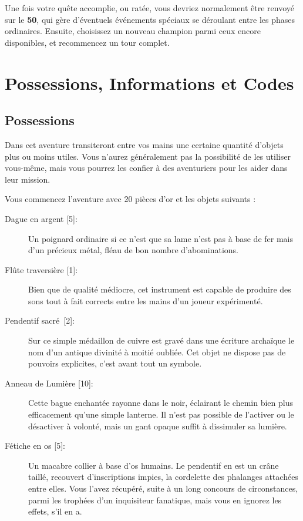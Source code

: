 \documentclass{report}
\begin{document}
Une fois votre quête accomplie, ou ratée, vous devriez normalement être renvoyé sur le \textbf{50}, qui gère d'éventuels événements spéciaux se déroulant entre les phases ordinaires. Ensuite, choisissez un nouveau champion parmi ceux encore disponibles, et recommencez un tour complet.

\section{Possessions, Informations et Codes}

\subsection{Possessions}

Dans cet aventure transiteront entre vos mains une certaine quantité d'objets plus ou moins utiles. Vous n'aurez généralement pas la possibilité de les utiliser vous-même, mais vous pourrez les confier à des aventuriers pour les aider dans leur mission.

Vous commencez l'aventure avec 20 pièces d'or et les objets suivants :
\begin{description}
\item[{Dague en argent [5]}:] Un poignard ordinaire si ce n'est que sa lame n'est pas à base de fer mais d'un précieux métal, fléau de bon nombre d'abominations.
\item[{Flûte traversière [1]}:] Bien que de qualité médiocre, cet instrument est capable de produire des sons tout à fait corrects entre les mains d'un joueur expérimenté.
\item[{Pendentif sacré [2]}:] Sur ce simple médaillon de cuivre est gravé dans une écriture archaïque le nom d'un antique divinité à moitié oubliée. Cet objet ne dispose pas de pouvoirs explicites, c'est avant tout un symbole.
\item[{Anneau de Lumière [10]}:] Cette bague enchantée rayonne dans le noir, éclairant le chemin bien plus  efficacement qu'une simple lanterne. Il n'est pas possible de l'activer ou le désactiver à volonté, mais un gant opaque suffit à dissimuler sa lumière.
\item[{Fétiche en os [5]}:] Un macabre collier à base d'os humains. Le pendentif en est un crâne taillé, recouvert d'inscriptions impies, la cordelette des phalanges attachées entre elles. Vous l'avez récupéré, suite à un long concours de circonstances, parmi les trophées d'un inquisiteur fanatique, mais vous en ignorez les effets, s'il en a.
\end{description}
\end{document}

